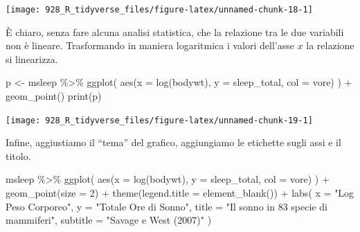 \documentclass[
]{memoir}
\newenvironment{Shaded}{\begin{snugshade}}{\end{snugshade}}
\newcommand{\AttributeTok}[1]{\textcolor[rgb]{0.77,0.63,0.00}{#1}}
\newcommand{\DecValTok}[1]{\textcolor[rgb]{0.00,0.00,0.81}{#1}}
\newcommand{\FunctionTok}[1]{\textcolor[rgb]{0.00,0.00,0.00}{#1}}
\newcommand{\NormalTok}[1]{#1}
\newcommand{\OtherTok}[1]{\textcolor[rgb]{0.56,0.35,0.01}{#1}}
\newcommand{\SpecialCharTok}[1]{\textcolor[rgb]{0.00,0.00,0.00}{#1}}
\newcommand{\StringTok}[1]{\textcolor[rgb]{0.31,0.60,0.02}{#1}}
\theoremstyle{definition}
\theoremstyle{definition}
\theoremstyle{definition}
\theoremstyle{definition}
\theoremstyle{remark}
\begin{document}
\begin{center}\texttt{[image: 928\_R\_tidyverse\_files/figure-latex/unnamed-chunk-18-1]} \end{center}

È chiaro, senza fare alcuna analisi statistica, che la relazione tra le due variabili non è lineare. Trasformando in maniera logaritmica i valori dell'asse \(x\) la relazione si linearizza.

\begin{Shaded}
\begin{Highlighting}[]
\NormalTok{p }\OtherTok{\textless{}{-}}\NormalTok{ msleep }\SpecialCharTok{\%\textgreater{}\%}
  \FunctionTok{ggplot}\NormalTok{(}
    \FunctionTok{aes}\NormalTok{(}\AttributeTok{x =} \FunctionTok{log}\NormalTok{(bodywt), }\AttributeTok{y =}\NormalTok{ sleep\_total, }\AttributeTok{col =}\NormalTok{ vore)}
\NormalTok{  ) }\SpecialCharTok{+}
  \FunctionTok{geom\_point}\NormalTok{()}
\FunctionTok{print}\NormalTok{(p)}
\end{Highlighting}
\end{Shaded}

\begin{center}\texttt{[image: 928\_R\_tidyverse\_files/figure-latex/unnamed-chunk-19-1]} \end{center}

Infine, aggiustiamo il ``tema'' del grafico, aggiungiamo le etichette sugli assi e il titolo.

\begin{Shaded}
\begin{Highlighting}[]
\NormalTok{msleep }\SpecialCharTok{\%\textgreater{}\%}
  \FunctionTok{ggplot}\NormalTok{(}
    \FunctionTok{aes}\NormalTok{(}\AttributeTok{x =} \FunctionTok{log}\NormalTok{(bodywt), }\AttributeTok{y =}\NormalTok{ sleep\_total, }\AttributeTok{col =}\NormalTok{ vore)}
\NormalTok{  ) }\SpecialCharTok{+}
  \FunctionTok{geom\_point}\NormalTok{(}\AttributeTok{size =} \DecValTok{2}\NormalTok{) }\SpecialCharTok{+}
  \FunctionTok{theme}\NormalTok{(}\AttributeTok{legend.title =} \FunctionTok{element\_blank}\NormalTok{()) }\SpecialCharTok{+}
  \FunctionTok{labs}\NormalTok{(}
    \AttributeTok{x =} \StringTok{"Log Peso Corporeo"}\NormalTok{,}
    \AttributeTok{y =} \StringTok{"Totale Ore di Sonno"}\NormalTok{,}
    \AttributeTok{title =} \StringTok{"Il sonno in 83 specie di mammiferi"}\NormalTok{,}
    \AttributeTok{subtitle =} \StringTok{"Savage e West (2007)"}
\NormalTok{  )}
\end{Highlighting}
\end{Shaded}
\end{document}

